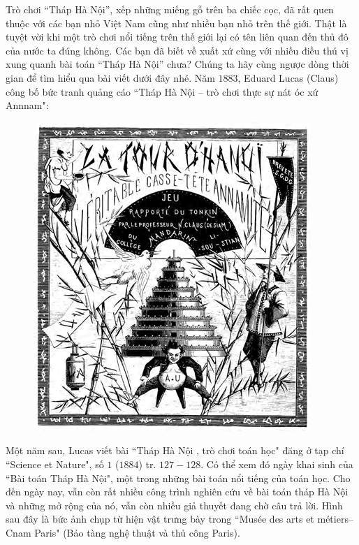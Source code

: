 	Trò chơi “Tháp Hà Nội”, xếp những miếng gỗ trên ba chiếc cọc, đã rất quen thuộc với các bạn nhỏ Việt Nam cũng như nhiều bạn nhỏ trên thế giới. Thật là tuyệt vời khi một trò chơi nổi tiếng trên thế giới lại có tên liên quan đến thủ đô của nước ta đúng không. Các bạn đã biết về xuất xứ cùng với nhiều điều thú vị xung quanh bài toán “Tháp Hà Nội” chưa? Chúng ta hãy cùng ngược dòng thời gian để tìm hiểu qua bài viết dưới đây nhé.
	\vskip 0.1cm
	Năm $1883$, Eduard Lucas (Claus) công bố  bức tranh quảng cáo ``Tháp Hà Nội --  trò chơi thực sự nát óc xứ Annnam":
	\begin{figure}[H]
		\centering
		\vspace*{-5pt}
		\captionsetup{labelformat= empty, justification=centering}
		\includegraphics[width=0.4\linewidth]{1.1}
		\vspace*{-10pt}
	\end{figure}
	Một năm sau, Lucas viết bài ``Tháp Hà Nội , trò chơi toán học" đăng ở tạp chí ``Science et Nature", số $1$ ($1884$) tr. $127-128$. Có thể xem đó ngày khai sinh của ``Bài toán Tháp Hà Nội", một trong những bài toán nổi tiếng của toán học. Cho đến ngày nay, vẫn còn rất nhiều công trình nghiên cứu về bài toán tháp Hà Nội và những mở rộng của nó, vẫn còn nhiều giả thuyết đang chờ câu trả lời.
	\vskip 0.1cm
	Hình sau đây là bức ảnh chụp từ hiện vật trưng bày trong ``Musée des arts et métiers--Cnam Paris" (Bảo tàng nghệ thuật và thủ công Paris). 
